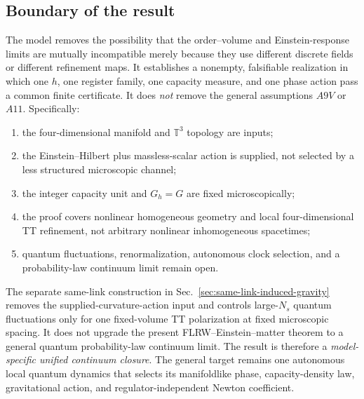\subsection{Boundary of the result}

The model removes the possibility that the order--volume and
Einstein-response limits are mutually incompatible merely because they use
different discrete fields or different refinement maps.  It establishes a
nonempty, falsifiable realization in which one \(h\), one register family,
one capacity measure, and one phase action pass a common finite certificate.
It does \emph{not} remove the general assumptions \(A9V\) or \(A11\).
Specifically:
\begin{enumerate}
\item the four-dimensional manifold and \(\mathbb T^3\) topology are inputs;
\item the Einstein--Hilbert plus massless-scalar action is supplied, not
selected by a less structured microscopic channel;
\item the integer capacity unit and \(G_h=G\) are fixed microscopically;
\item the proof covers nonlinear homogeneous geometry and local
four-dimensional TT refinement, not arbitrary nonlinear inhomogeneous
spacetimes;
\item quantum fluctuations, renormalization, autonomous clock selection, and
a probability-law continuum limit remain open.
\end{enumerate}
The separate same-link construction in
Sec.~\ref{sec:same-link-induced-gravity} removes the supplied-curvature-action
input and controls large-\(N_s\) quantum fluctuations only for one
fixed-volume TT polarization at fixed microscopic spacing.  It does not
upgrade the present FLRW--Einstein--matter theorem to a general quantum
probability-law continuum limit.
The result is therefore a \emph{model-specific unified continuum closure}.
The general target remains one autonomous local quantum dynamics that
selects its manifoldlike phase, capacity-density law, gravitational action,
and regulator-independent Newton coefficient.
